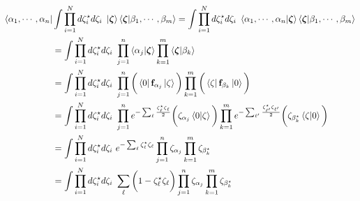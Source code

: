 \documentclass{homework}
\begin{document}
\begin{tcolorbox}[colback=yellow!10!white,colframe=red!75!black,lowerbox=invisible, title = Fermionic closure relation]
\begin{equation}
    \begin{split}
        \bra{\alpha_1, \cdots, \alpha_n}& \int \prod_{i=1}^{N} d\zeta^\star_i d\zeta_i \textnormal{ } \ket{\bm{\zeta}}\bra{\bm{\zeta}} \ket{\beta_1, \cdots, \beta_m} = \int \prod_{i=1}^{N} d\zeta^\star_i d\zeta_i \textnormal{ } \bra{\alpha_1, \cdots, \alpha_n}\ket{\bm{\zeta}} \bra{\bm{\zeta}} \ket{\beta_1, \cdots, \beta_m}\\
        &= \int \prod_{i=1}^{N} d\zeta^\star_i d\zeta_i \textnormal{ } \prod_{j=1}^{n} \bra{\alpha_j}\ket{\bm{\zeta}} \prod_{k=1}^{m} \bra{\bm{\zeta}} \ket{\beta_k} \\
        &= \int \prod_{i=1}^{N} d\zeta^\star_i d\zeta_i \textnormal{ } \prod_{j=1}^{n} \bigg(\bra{0} {{\bf f}}_{\alpha_j} \ket{\zeta}\bigg) \prod_{k=1}^{m}\bigg(\bra{\zeta} {{\bf f}}_{\beta_k} \ket{0}\bigg) \\
        &= \int \prod_{i=1}^{N} d\zeta^\star_i d\zeta_i \textnormal{ } \prod_{j=1}^{n} e^{-\sum_{\ell} \frac{\zeta^\star_\ell\zeta_\ell}{2}} \bigg(\zeta_{\alpha_j} \bra{0}\ket{\zeta} \bigg) \prod_{k=1}^{m} e^{-\sum_{{\ell'}} \frac{\zeta^\star_{\ell'}\zeta_{\ell'}}{2}}\bigg(\zeta_{\beta_{k}^\star} \bra{\zeta} \ket{0}\bigg) \\
        &= \int \prod_{i=1}^{N} d\zeta^\star_i d\zeta_i \textnormal{ } e^{-\sum_{\ell} {\zeta^\star_\ell\zeta_\ell}} \prod_{j=1}^{n} \zeta_{\alpha_j} \prod_{k=1}^{m} \zeta_{\beta_{k}^\star} \\
        &= \int \prod_{i=1}^{N} d\zeta^\star_i d\zeta_i \textnormal{ } \sum_{\ell} \bigg(1-\zeta^\star_\ell\zeta_\ell \bigg)  \prod_{j=1}^{n} \zeta_{\alpha_j} \prod_{k=1}^{m} \zeta_{\beta_{k}^\star}
 \end{split}
\end{equation}

\end{tcolorbox}
\end{document}
